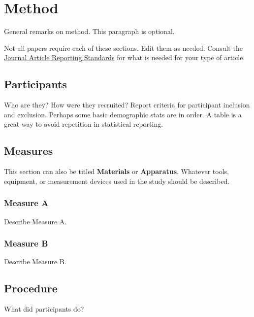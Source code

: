 \documentclass[
  jou,
  colorlinks=true,linkcolor=blue,citecolor=blue,urlcolor=blue]{apa7}
\begin{document}
\hypertarget{method-1}{%
\section{Method}\label{method-1}}

General remarks on method. This paragraph is optional.

Not all papers require each of these sections. Edit them as needed.
Consult the \href{https://apastyle.apa.org/jars}{Journal Article
Reporting Standards} for what is needed for your type of article.

\hypertarget{participants-1}{%
\subsection{Participants}\label{participants-1}}

Who are they? How were they recruited? Report criteria for participant
inclusion and exclusion. Perhaps some basic demographic stats are in
order. A table is a great way to avoid repetition in statistical
reporting.

\hypertarget{measures}{%
\subsection{Measures}\label{measures}}

This section can also be titled \textbf{Materials} or
\textbf{Apparatus}. Whatever tools, equipment, or measurement devices
used in the study should be described.

\hypertarget{measure-a}{%
\subsubsection{Measure A}\label{measure-a}}

Describe Measure A.

\hypertarget{measure-b}{%
\subsubsection{Measure B}\label{measure-b}}

Describe Measure B.

\hypertarget{procedure}{%
\subsection{Procedure}\label{procedure}}

What did participants do?
\end{document}
